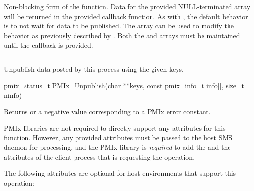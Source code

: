 \descr

Non-blocking form of the  function.
Data for the provided NULL-terminated  array will be returned in the provided callback function.
As with , the default behavior is to not wait for data to be published.
The  array can be used to modify the behavior as previously described by . Both the  and  arrays must be maintained until the callback is provided.



\subsection{}

\summary

Unpublish data posted by this process using the given keys.

\format

\cspecificstart
\begin{codepar}
pmix_status_t
PMIx_Unpublish(char **keys,
               const pmix_info_t info[], size_t ninfo)
\end{codepar}
\cspecificend

\begin{arglist}
\end{arglist}

Returns  or a negative value corresponding to a PMIx error constant.

\reqattrstart
\ac{PMIx} libraries are not required to directly support any attributes for this function. However, any provided attributes must be passed to the host \ac{SMS} daemon for processing, and the \ac{PMIx} library is \textit{required} to add the  and the  attributes of the client process that is requesting the operation.

\reqattrend

\optattrstart
The following attributes are optional for host environments that support this operation:


\optattrend

